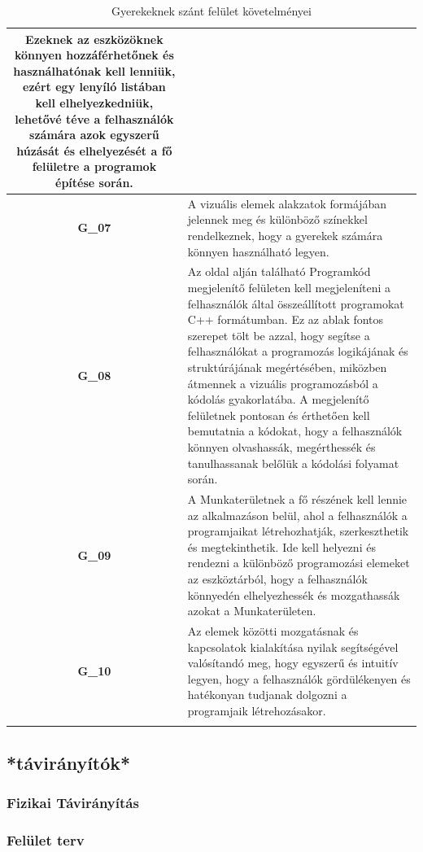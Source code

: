 \documentclass{article}
\begin{document}
\begin{longtable}{|c|p{14cm}|}
Ezeknek az eszközöknek könnyen hozzáférhetőnek és használhatónak kell lenniük, ezért egy lenyíló listában kell elhelyezkedniük, lehetővé téve a felhasználók számára azok egyszerű húzását és elhelyezését a fő felületre a programok építése során.\\\hline

\textbf{G\_07} & A vizuális elemek alakzatok formájában jelennek meg és különböző színekkel rendelkeznek, hogy a gyerekek számára könnyen használható legyen. \\\hline
\textbf{G\_08} & Az oldal alján található Programkód megjelenítő felületen kell megjeleníteni a felhasználók által összeállított programokat C++ formátumban. Ez az ablak fontos szerepet tölt be azzal, hogy segítse a felhasználókat a programozás logikájának és struktúrájának megértésében, miközben átmennek a vizuális programozásból a kódolás gyakorlatába. A megjelenítő felületnek pontosan és érthetően kell bemutatnia a kódokat, hogy a felhasználók könnyen olvashassák, megérthessék és tanulhassanak belőlük a kódolási folyamat során.\\\hline

\textbf{G\_09} & A Munkaterületnek a fő részének kell lennie az alkalmazáson belül, ahol a felhasználók a programjaikat létrehozhatják, szerkeszthetik és megtekinthetik. Ide kell helyezni és rendezni a különböző programozási elemeket az eszköztárból, hogy a felhasználók könnyedén elhelyezhessék és mozgathassák azokat a Munkaterületen.\\\hline

\textbf{G\_10} & Az elemek közötti mozgatásnak és kapcsolatok kialakítása nyilak segítségével valósítandó meg, hogy egyszerű és intuitív legyen, hogy a felhasználók gördülékenyen és hatékonyan tudjanak dolgozni a programjaik létrehozásakor. \\\hline
\hline
\caption{Gyerekeknek szánt felület követelményei}
\end{longtable}
\endgroup

\subsection{*távirányítók*}
\subsubsection{Fizikai Távirányítás}
\subsubsection{Felület terv}
\end{document}
